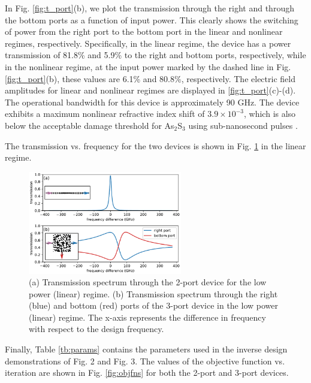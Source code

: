 In Fig. \ref{fig:t_port}(b), we plot the transmission through the right and through the bottom ports as a function of input power. This clearly shows the switching of power from the right port to the bottom port in the linear and nonlinear regimes, respectively.  Specifically, in the linear regime, the device has a power transmission of 81.8\% and 5.9\% to the right and bottom ports, respectively, while in the nonlinear regime, at the input power marked by the dashed line in Fig. \ref{fig:t_port}(b), these values are 6.1\% and 80.8\%, respectively. The electric field amplitudes for linear and nonlinear regimes are displayed in \ref{fig:t_port}(c)-(d). The operational bandwidth for this device is approximately 90 GHz.  The device exhibits a maximum nonlinear refractive index shift of $3.9 \times 10^{-3}$, which is also below the acceptable damage threshold for As$_2$S$_3$ using sub-nanosecond pulses \cite{chorel2018robust}.


The transmission vs. frequency for the two devices is shown in Fig. \ref{fig:spectra} in the linear regime.

\begin{figure}[h]
\centering
\includegraphics[width=0.6\textwidth]{figures/angler_spectra_11_2.pdf}
\caption{\label{fig:spectra} (a) Transmission spectrum through the 2-port device for the low power (linear) regime. (b) Transmission spectrum through the right (blue) and bottom (red) ports of the 3-port device in the low power (linear) regime.  The x-axis represents the difference in frequency with respect to the design frequency.}
\end{figure}

Finally, Table \ref{tb:params} contains the parameters used in the inverse design demonstrations of Fig. 2 and Fig. 3. The values of the objective function vs. iteration are shown in Fig. \ref{fig:objfns} for both the 2-port and 3-port devices.


